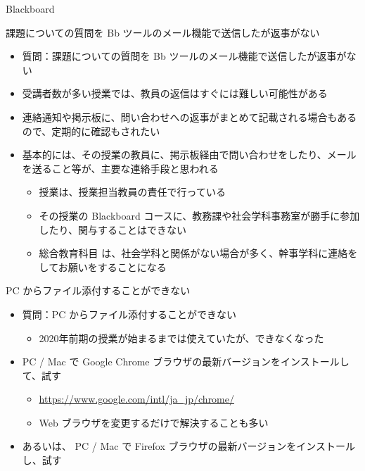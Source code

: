 \documentclass[a4j,10pt]{jsarticle}
\begin{document}
{\newpage\clearpage
{}%
\begin{frame}[label={sec:org166405d},fragile]{Blackboard}
 \begin{block}{課題についての質問を Bb ツールのメール機能で送信したが返事がない}
\begin{itemize}
\item 質問：課題についての質問を Bb ツールのメール機能で送信したが返事がない
\par
\item 受講者数が多い授業では、教員の返信はすぐには難しい可能性がある
\item 連絡通知や掲示板に、問い合わせへの返事がまとめて記載される場合もあるので、定期的に確認もされたい
\item 基本的には、その授業の教員に、掲示板経由で問い合わせをしたり、メールを送ること等が、主要な連絡手段と思われる
\begin{itemize}
\item 授業は、授業担当教員の責任で行っている
\item その授業の Blackboard コースに、教務課や社会学科事務室が勝手に参加したり、関与することはできない
\item 総合教育科目 は、社会学科と関係がない場合が多く、幹事学科に連絡をしてお願いをすることになる
\end{itemize}
\end{itemize}
\end{block}
\par
\begin{block}{PC からファイル添付することができない}
\begin{itemize}
\item 質問：PC からファイル添付することができない
\begin{itemize}
\item 2020年前期の授業が始まるまでは使えていたが、できなくなった
\end{itemize}
\par
\item PC / Mac で Google Chrome ブラウザの最新バージョンをインストールして、試す
\begin{itemize}
\item \url{https://www.google.com/intl/ja\_jp/chrome/}
\item Web ブラウザを変更するだけで解決することも多い
\end{itemize}
\par
\item あるいは、 PC / Mac で Firefox ブラウザの最新バージョンをインストールし、試す

\end{itemize}
\end{block}
\end{frame}}
\end{document}
